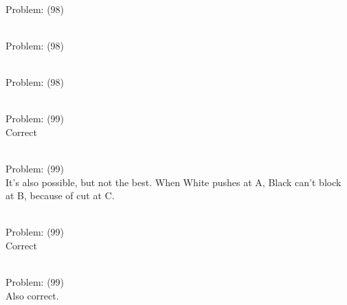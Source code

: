 \documentclass[11pt]{article}
\begin{document}
\begin{minipage}[t]{0.5\textwidth}
  {\centering
  
\\
Problem: (98)\\
  }
\end{minipage}
\begin{minipage}[t]{0.5\textwidth}
  {\centering
  
\\
Problem: (98)\\
  }
\end{minipage}
\begin{minipage}[t]{0.5\textwidth}
  {\centering
  
\\
Problem: (98)\\
  }
\end{minipage}
\begin{minipage}[t]{0.5\textwidth}
  {\centering
  
\\
Problem: (99)\\
Correct\\
  }
\end{minipage}
\begin{minipage}[t]{0.5\textwidth}
  {\centering
  
\\
Problem: (99)\\
It's also possible, but not the best. When White pushes at A, Black can't block at B, because of cut at C.\\
  }
\end{minipage}
\begin{minipage}[t]{0.5\textwidth}
  {\centering
  
\\
Problem: (99)\\
Correct\\
  }
\end{minipage}
\begin{minipage}[t]{0.5\textwidth}
  {\centering
  
\\
Problem: (99)\\
Also correct.\\
  }
\end{minipage}
\end{document}
